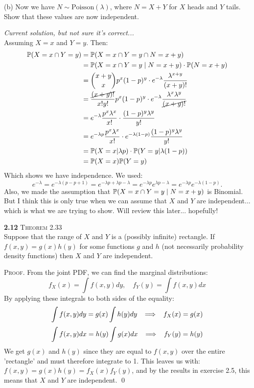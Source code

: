 \newpage\noindent
(b) Now we have $N\sim\text{Poisson}(\lambda)$, where $N = X + Y$ for $X$ heads
and $Y$ tails. Show that these values are now independent.

\medskip\noindent\emph{Current solution, but not sure it's correct...}\\
Assuming $X=x$ and $Y=y$. Then:
\begin{align*}
    \P(X=x\cap Y=y) &= \P(X=x\cap Y=y\cap N = x+y) \\
    &= \P(X=x\cap Y=y \mid N = x+y)\cdot\P(N = x+y) \\
    &= {x+y\choose x}p^x(1-p)^y\cdot e^{-\lambda}\frac{\lambda^{x+y}}{(x+y)!} \\
    &= \frac{\cancel{(x+y)!}}{x!y!}p^x(1-p)^y\cdot e^{-\lambda}\frac{\lambda^x\lambda^y}{\cancel{(x+y)!}} \\
    &= e^{-\lambda}\frac{p^x\lambda^x}{x!}\cdot\frac{(1-p)^y\lambda^y}{y!} \\
    &= e^{-\lambda p}\frac{p^x\lambda^x}{x!}\cdot e^{-\lambda(1-p)}\frac{(1-p)^y\lambda^y}{y!} \\
    &= \P(X=x | \lambda p)\cdot\P(Y=y|\lambda(1-p)) \\
    &= \P(X=x)\P(Y=y)
\end{align*}
Which shows we have independence. We used:
$$
e^{-\lambda} = e^{-\lambda(p - p + 1)} = e^{-\lambda p + \lambda p - \lambda}
= e^{-\lambda p}e^{\lambda p - \lambda} = e^{-\lambda p}e^{-\lambda(1-p)}.
$$
Also, we made the assumption that $\P(X=x\cap Y=y \mid N = x+y)$ is Binomial. But I think this is
only true when we can assume that $X$ and $Y$ are independent... which is what we are trying to show.
Will review this later... hopefully!

\bigskip\noindent
\textbf{2.12} \textsc{Theorem} 2.33\\  %
Suppose that the range of $X$ and $Y$ is a (possibly infinite)
rectangle. If $f(x, y) = g(x)h(y)$ for some functions $g$ and $h$ (not necessarily
probability density functions) then $X$ and $Y$ are independent.

\medskip\noindent\textsc{Proof}. From the joint PDF, we can find the marginal distributions:
$$
f_X(x) = \int f(x, y) dy, \quad
f_Y(y) = \int f(x, y) dx
$$
By applying these integrals to both sides of the equality:
$$
\int f(x, y) dy = g(x)\int h(y) dy \imp f_X(x) = g(x)
$$
$$
\int f(x, y) dx = h(y)\int g(x) dx \imp f_Y(y) = h(y)
$$
We get $g(x)$ and $h(y)$ since they are equal to $f(x,y)$ over the entire 'rectangle' and must therefore
integrate to 1. This leaves us with: $f(x, y) = g(x)h(y) = f_X(x)f_Y(y)$, and by the results in exercise 2.5,
this means that $X$ and $Y$ are independent. \qed

